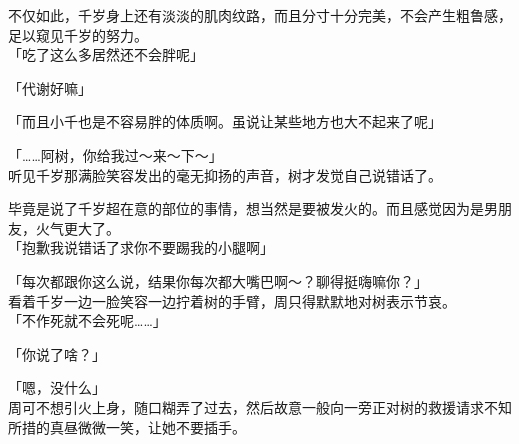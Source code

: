 不仅如此，千岁身上还有淡淡的肌肉纹路，而且分寸十分完美，不会产生粗鲁感，足以窥见千岁的努力。\\

「吃了这么多居然还不会胖呢」

「代谢好嘛」

「而且小千也是不容易胖的体质啊。虽说让某些地方也大不起来了呢」

「……阿树，你给我过～来～下～」\\

听见千岁那满脸笑容发出的毫无抑扬的声音，树才发觉自己说错话了。

毕竟是说了千岁超在意的部位的事情，想当然是要被发火的。而且感觉因为是男朋友，火气更大了。\\

「抱歉我说错话了求你不要踢我的小腿啊」

「每次都跟你这么说，结果你每次都大嘴巴啊～？聊得挺嗨嘛你？」\\

看着千岁一边一脸笑容一边拧着树的手臂，周只得默默地对树表示节哀。\\

「不作死就不会死呢……」

「你说了啥？」

「嗯，没什么」\\

周可不想引火上身，随口糊弄了过去，然后故意一般向一旁正对树的救援请求不知所措的真昼微微一笑，让她不要插手。\\

